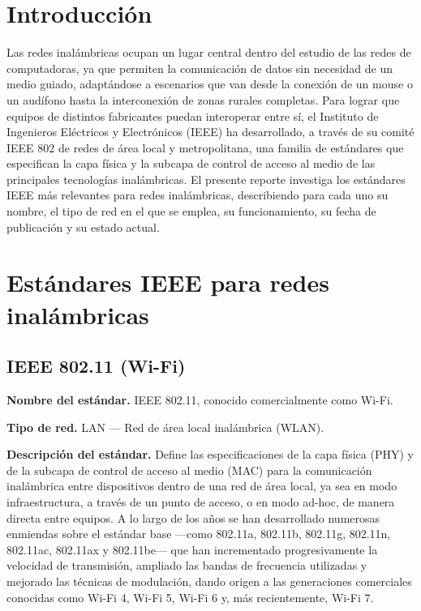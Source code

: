\documentclass[12pt,letterpaper]{article}
\begin{document}
\tableofcontents
\newpage

\section{Introducción}

Las redes inalámbricas ocupan un lugar central dentro del estudio de las redes de computadoras, ya que permiten la comunicación de datos sin necesidad de un medio guiado, adaptándose a escenarios que van desde la conexión de un mouse o un audífono hasta la interconexión de zonas rurales completas. Para lograr que equipos de distintos fabricantes puedan interoperar entre sí, el Instituto de Ingenieros Eléctricos y Electrónicos (IEEE) ha desarrollado, a través de su comité IEEE 802 de redes de área local y metropolitana, una familia de estándares que especifican la capa física y la subcapa de control de acceso al medio de las principales tecnologías inalámbricas. El presente reporte investiga los estándares IEEE más relevantes para redes inalámbricas, describiendo para cada uno su nombre, el tipo de red en el que se emplea, su funcionamiento, su fecha de publicación y su estado actual.

\section{Estándares IEEE para redes inalámbricas}

\subsection{IEEE 802.11 (Wi-Fi)}

\textbf{Nombre del estándar.} IEEE 802.11, conocido comercialmente como Wi-Fi.

\textbf{Tipo de red.} LAN — Red de área local inalámbrica (WLAN).

\textbf{Descripción del estándar.} Define las especificaciones de la capa física (PHY) y de la subcapa de control de acceso al medio (MAC) para la comunicación inalámbrica entre dispositivos dentro de una red de área local, ya sea en modo infraestructura, a través de un punto de acceso, o en modo ad-hoc, de manera directa entre equipos. A lo largo de los años se han desarrollado numerosas enmiendas sobre el estándar base —como 802.11a, 802.11b, 802.11g, 802.11n, 802.11ac, 802.11ax y 802.11be— que han incrementado progresivamente la velocidad de transmisión, ampliado las bandas de frecuencia utilizadas y mejorado las técnicas de modulación, dando origen a las generaciones comerciales conocidas como Wi-Fi 4, Wi-Fi 5, Wi-Fi 6 y, más recientemente, Wi-Fi 7.
\end{document}
